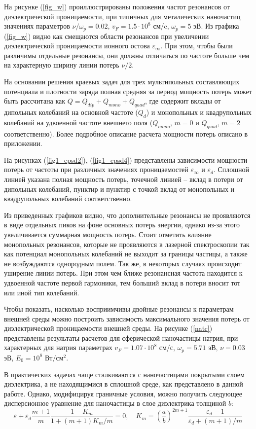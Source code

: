 \documentclass[12pt, a4paper]{article}
\def \eps {\varepsilon}
\def \w {\omega}
\begin{document}
На рисунке (\ref{fig_w}) проиллюстрированы положения частот резонансов от диэлектрической проницаемости, при типичных для металических наночастиц значениях параметров $\nu / \w_p = 0.02$, $v_F = 1.5 \cdot 10^8$ см/c, $\w_p = 5$ эВ. Из графика (\ref{fig_w}) видно как смещаются области резонансов при увеличении диэлектрической проницаемости ионного остова $\eps_\infty$. При этом, чтобы были различимы отдельные резонансы, они должны отличаться по частоте больше чем на характерную ширину линии потерь $\nu/2$.

На основании решения краевых задач для трех мультипольных составляющих потенциала и плотности заряда полная средняя за период мощность потерь может быть рассчитана как $Q = Q_{dip} + Q_{mono} + Q_{quad}$, где  содержит вклады от дипольных колебаний на основной частоте ($Q_d$) и монопольных и квадрупольных колебаний на удвоенной частоте внешнего поля ($Q_{mono}$, $m=0$ и $Q_{quad}$, $m=2$ соответственно). Более подробное описание расчета мощности потерь описано в приложении. 

На рисунках (\ref{fig1_epsd2}), (\ref{fig1_epsd4}) представлены зависимости мощности потерь от частоты при различных значениях проницаемостей $\eps_\infty$ и $\eps_d$. Сплошной линией указана полная мощность потерь, точечной линией – вклад в потери от дипольных колебаний, пунктир и пунктир с точкой вклад от монопольных и квадрупольных колебаний соответственно. 

Из приведенных графиков видно, что дополнительные резонансы не проявляются в виде отдельных пиков на фоне основных потерь энергии, однако из-за этого увеличивается суммарная мощность потерь. Стоит отметить влияние монопольных резонансов, которые не проявляются в лазерной спектроскопии так как потенциал монопольных колебаний не выходит за границы частицы, а также не возбуждаются однородным полем. Так же, в некоторых случаях происходит уширение линии потерь. При этом чем ближе резонансная частота находится к удвоенной частоте первой гармоники, тем больший вклад в потери вносит тот или иной тип колебаний.

Чтобы показать, насколько восприимчивы двойные резонансы к параметрам внешней среды можно построить зависимость максимального значения потерь от диэлектрической проницаемости внешней среды. На рисунке (\ref{natr}) представлены результаты расчетов для сферической наночастицы натрия, при характерных для натрия параметрах $v_F = 1.07\cdot10^8$ см/с, $\w_p = 5.71$ эВ, $\nu = 0.03$ эВ, $E_0=10^8$ $\text{Вт}/\text{см}^2$.

В практических задачах чаще сталкиваются с наночастицами покрытыми слоем диэлектрика, а не находящимися в сплошной среде, как представлено в данной работе. Однако, модифицируя граничные условия, можно получить следующее дисперсионное уравнение для наночастицы в слое диэлектрика толщиной $b$:
\begin{equation} 	
	\eps + \eps_d\frac{m+1}{m}  \frac{1-K_m}{1 + (m+1)K_m/m} = 0, \quad K_m = (\frac{a}{b})^{2m+1} \frac{\eps_d - 1}{\eps_d + (m+1)/m}
\end{equation}
\end{document}
